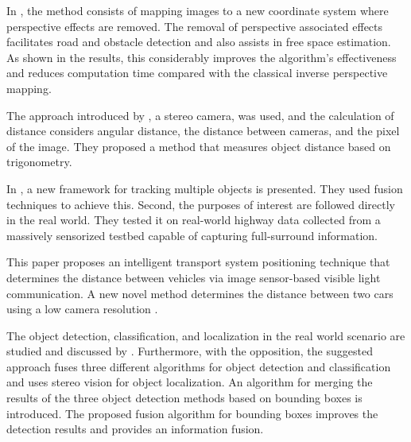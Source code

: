 In \cite{Oliveira2015}, the method consists of mapping images to a new coordinate system where perspective effects are removed. The removal of perspective associated effects facilitates road and obstacle detection and also assists in free space estimation. As shown in the results, this considerably improves the algorithm's effectiveness and reduces computation time compared with the classical inverse perspective mapping.

The approach introduced by \cite{Salman2017}, a stereo camera, was used, and the calculation of distance considers angular distance, the distance between cameras, and the pixel of the image. They proposed a method that measures object distance based on trigonometry.   

 In \cite{Rangesh2019}, a new framework for tracking multiple objects is presented. They used fusion techniques to achieve this. Second, the purposes of interest are followed directly in the real world. They tested it on real-world highway data collected from a massively sensorized testbed capable of capturing full-surround information.



This paper proposes an intelligent transport system positioning technique that determines the distance between vehicles via image sensor-based visible light communication. A new novel method determines the distance between two cars using a low camera resolution \cite{Tram2018}.


The object detection, classification, and localization in the real world scenario are studied and discussed by \cite{Hofmann2019}. Furthermore, with the opposition, the suggested approach fuses three different algorithms for object detection and classification and uses stereo vision for object localization.  An algorithm for merging the results of the three object detection methods based on bounding boxes is introduced. The proposed fusion algorithm for bounding boxes improves the detection results and provides an information fusion.

